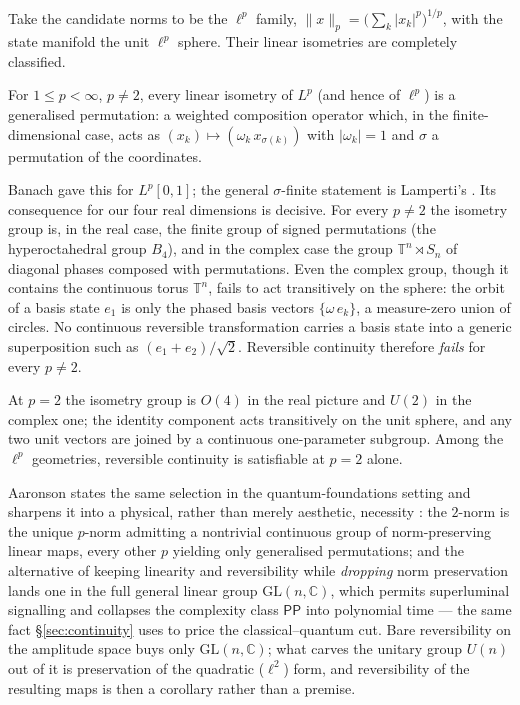 Take the candidate norms to be the $\ell^{p}$ family,
$\lVert x\rVert_{p}=\bigl(\sum_{k}\lvert x_{k}\rvert^{p}\bigr)^{1/p}$, with the state manifold
the unit $\ell^{p}$ sphere. Their linear isometries are completely classified.


\begin{proposition}
\label{prop:lamperti}
For $1\le p<\infty$, $p\neq 2$, every linear isometry of $L^{p}$ (and hence of $\ell^{p}$) is a
generalised permutation: a weighted composition operator which, in the finite-dimensional case,
acts as $(x_{k})\mapsto(\omega_{k}\,x_{\sigma(k)})$ with $\lvert\omega_{k}\rvert=1$ and $\sigma$
a permutation of the coordinates.
\end{proposition}

\noindent Banach gave this for $L^{p}[0,1]$; the general $\sigma$-finite statement is Lamperti's
\autocite{Banach1932, Lamperti1958}. Its consequence for our four real dimensions is decisive.
For every $p\neq 2$ the isometry group is, in the real case, the finite group of signed
permutations (the hyperoctahedral group $B_{4}$), and in the complex case the group
$\mathbb{T}^{n}\rtimes S_{n}$ of diagonal phases composed with permutations. Even the complex
group, though it contains the continuous torus $\mathbb{T}^{n}$, fails to act transitively on
the sphere: the orbit of a basis state $e_{1}$ is only the phased basis vectors
$\{\omega\,e_{k}\}$, a measure-zero union of circles. No continuous reversible transformation
carries a basis state into a generic superposition such as $(e_{1}+e_{2})/\sqrt{2}$. Reversible
continuity therefore \emph{fails} for every $p\neq 2$.

At $p=2$ the isometry group is $O(4)$ in the real picture and $U(2)$ in the complex one; the
identity component acts transitively on the unit sphere, and any two unit vectors are joined by
a continuous one-parameter subgroup. Among the $\ell^{p}$ geometries, reversible continuity is
satisfiable at $p=2$ alone.

Aaronson states the same selection in the quantum-foundations setting and sharpens it into a
physical, rather than merely aesthetic, necessity \autocite{Aaronson2004h}: the $2$-norm is the
unique $p$-norm admitting a nontrivial continuous group of norm-preserving linear maps, every
other $p$ yielding only generalised permutations; and the alternative of keeping linearity and
reversibility while \emph{dropping} norm preservation lands one in the full general linear group
$\mathrm{GL}(n,\mathbb{C})$, which permits superluminal signalling and collapses the complexity
class $\mathsf{PP}$ into polynomial time --- the same fact \S\ref{sec:continuity} uses to price
the classical--quantum cut. Bare reversibility on the amplitude space buys only
$\mathrm{GL}(n,\mathbb{C})$; what carves the unitary group $U(n)$ out of it is preservation of
the quadratic ($\ell^{2}$) form, and reversibility of the resulting maps is then a corollary
rather than a premise.

